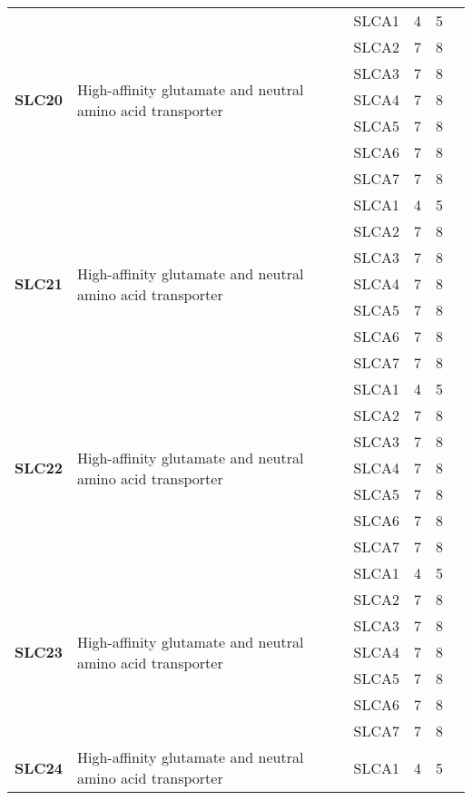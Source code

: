 \documentclass[12pt]{report}
\begin{document}
\begin{center}
\begin{longtable}{|p{1.5cm}|p{3.2cm}|p{1.9cm}|p{1.65cm}|p{3cm}|p{3cm}|}
\hline
\multirow{7}{1.5cm}{\textbf{SLC20}} & \multirow{7}{4cm}{High-affinity glutamate and neutral amino acid transporter} & SLCA1 & 4 & 5\\ 
\cline{3-6}
&&SLCA2&7 & 8&\\ 
\cline{3-6}
&&SLCA3&7 & 8&\\ 
\cline{3-6}
&&SLCA4&7 & 8&\\ 
\cline{3-6}
&&SLCA5&7 & 8&\\ 
\cline{3-6}
&&SLCA6&7 & 8&\\ 
\cline{3-6}
&&SLCA7&7 & 8&\\ 
\hline
\multirow{7}{1.5cm}{\textbf{SLC21}} & \multirow{7}{4cm}{High-affinity glutamate and neutral amino acid transporter} & SLCA1 & 4 & 5\\ 
\cline{3-6}
&&SLCA2&7 & 8&\\ 
\cline{3-6}
&&SLCA3&7 & 8&\\ 
\cline{3-6}
&&SLCA4&7 & 8&\\ 
\cline{3-6}
&&SLCA5&7 & 8&\\ 
\cline{3-6}
&&SLCA6&7 & 8&\\ 
\cline{3-6}
&&SLCA7&7 & 8&\\ 
\hline
\multirow{7}{1.5cm}{\textbf{SLC22}} & \multirow{7}{4cm}{High-affinity glutamate and neutral amino acid transporter} & SLCA1 & 4 & 5\\ 
\cline{3-6}
&&SLCA2&7 & 8&\\ 
\cline{3-6}
&&SLCA3&7 & 8&\\ 
\cline{3-6}
&&SLCA4&7 & 8&\\ 
\cline{3-6}
&&SLCA5&7 & 8&\\ 
\cline{3-6}
&&SLCA6&7 & 8&\\ 
\cline{3-6}
&&SLCA7&7 & 8&\\ 
\hline
\multirow{7}{1.5cm}{\textbf{SLC23}} & \multirow{7}{4cm}{High-affinity glutamate and neutral amino acid transporter} & SLCA1 & 4 & 5\\ 
\cline{3-6}
&&SLCA2&7 & 8&\\ 
\cline{3-6}
&&SLCA3&7 & 8&\\ 
\cline{3-6}
&&SLCA4&7 & 8&\\ 
\cline{3-6}
&&SLCA5&7 & 8&\\ 
\cline{3-6}
&&SLCA6&7 & 8&\\ 
\cline{3-6}
&&SLCA7&7 & 8&\\ 
\hline
\multirow{7}{1.5cm}{\textbf{SLC24}} & \multirow{7}{4cm}{High-affinity glutamate and neutral amino acid transporter} & SLCA1 & 4 & 5\\ 

\end{longtable}
\end{center}
\end{document}
